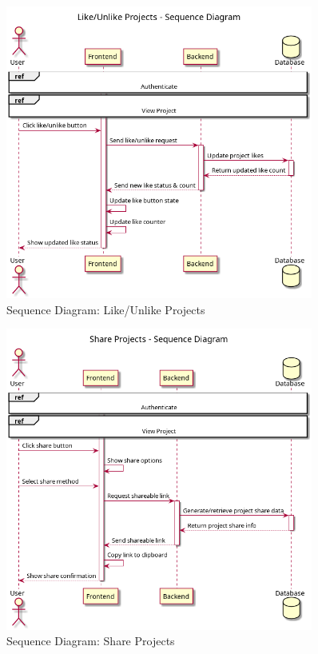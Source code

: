 \begin{figure}[H]
\centering
\includegraphics[width=0.9\textwidth]{conception/SprintV/sequence_diagrams/sequence_communityInteraction_6_4_LikeUnlikeProjects.png}
\caption{Sequence Diagram: Like/Unlike Projects}
\label{fig:seq_like_projects}
\end{figure}

\begin{figure}[H]
\centering
\includegraphics[width=0.9\textwidth]{conception/SprintV/sequence_diagrams/sequence_communityInteraction_6_5_ShareProjects.png}
\caption{Sequence Diagram: Share Projects}
\label{fig:seq_share_projects}
\end{figure}

